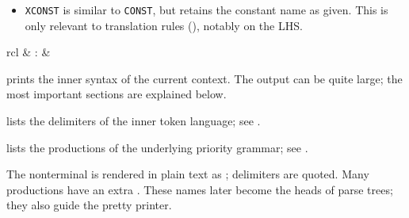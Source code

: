 \begin{isabellebody}
\begin{isamarkuptext}
\begin{itemize}
  \item \verb|XCONST| is similar to \verb|CONST|, but
  retains the constant name as given.  This is only relevant to
  translation rules (), notably on the LHS.

  \end{itemize}%
\end{isamarkuptext}%
\isamarkuptrue%
%
\isamarkuptrue%
%
\begin{isamarkuptext}%
\begin{matharray}{rcl}
    \hypertarget{command.print-syntax}{\hyperlink{command.print-syntax}{\mbox{}}} & : &  \\
  \end{matharray}

  \begin{description}

  \item \hyperlink{command.print-syntax}{\mbox{}} prints the inner syntax of the
  current context.  The output can be quite large; the most important
  sections are explained below.

  \begin{description}

  \item {} lists the delimiters of the inner token
  language; see .

  \item {} lists the productions of the underlying
  priority grammar; see .

  The nonterminal  is rendered in plain text as ; delimiters are quoted.  Many productions have an extra
  .  These names later become the heads of parse
  trees; they also guide the pretty printer.


\end{description}
\end{description}
\end{isamarkuptext}
\end{isabellebody}
